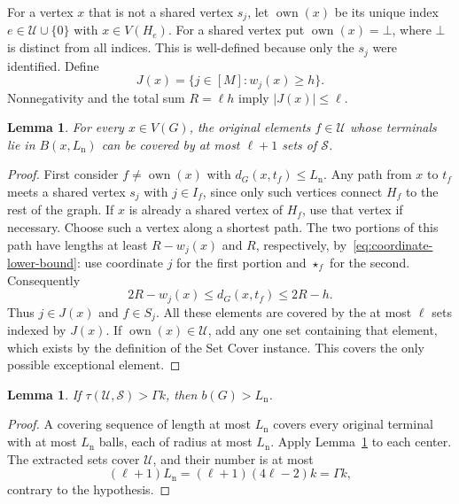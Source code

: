 \documentclass[11pt]{article}
\numberwithin{equation}{section}
\newtheorem{lemma}[theorem]{Lemma}
\theoremstyle{definition}
\begin{document}
For a vertex $x$ that is not a shared vertex $s_j$, let
$\operatorname{own}(x)$ be its unique index
$e\in\mathcal U\cup\{0\}$ with $x\in V(H_e)$. For a shared vertex put
$\operatorname{own}(x)=\bot$, where $\bot$ is distinct from all indices.
This is well-defined because only the $s_j$ were identified.
Define
\begin{equation}\label{eq:heavy-coordinates}
 J(x)=\{j\in[M]:w_j(x)\ge h\}.
\end{equation}
Nonnegativity and the total sum $R=\ell h$ imply $|J(x)|\le\ell$.

\begin{lemma}\label{lem:ball-extraction}
For every $x\in V(G)$, the original elements $f\in\mathcal U$ whose
terminals lie in $B(x,L_{\mathrm n})$ can be covered by at most
$\ell+1$ sets of $\mathcal S$.
\end{lemma}
\begin{proof}
First consider $f\ne\operatorname{own}(x)$ with
$d_G(x,t_f)\le L_{\mathrm n}$. Any path from $x$ to $t_f$ meets a
shared vertex $s_j$ with $j\in I_f$, since only such vertices connect
$H_f$ to the rest of the graph. If $x$ is already a shared vertex of
$H_f$, use that vertex if necessary. Choose such a vertex along a
shortest path. The two portions of this path have lengths at least
$R-w_j(x)$ and $R$, respectively, by~\eqref{eq:coordinate-lower-bound}:
use coordinate $j$ for the first portion and $\star_f$ for the second.
Consequently
\[
 2R-w_j(x)\le d_G(x,t_f)\le 2R-h.
\]
Thus $j\in J(x)$ and $f\in S_j$.
All these elements are covered by the at most $\ell$ sets indexed by
$J(x)$. If $\operatorname{own}(x)\in\mathcal U$, add any one set
containing that element, which exists by the definition of the Set
Cover instance. This covers the only possible exceptional element.
\end{proof}

\begin{lemma}\label{lem:hardness-soundness}
If $\tau(\mathcal U,\mathcal S)>\Gamma k$, then
$b(G)>L_{\mathrm n}$.
\end{lemma}
\begin{proof}
A covering sequence of length at most $L_{\mathrm n}$ covers every
original terminal with at most $L_{\mathrm n}$ balls, each of radius
at most $L_{\mathrm n}$. Apply Lemma~\ref{lem:ball-extraction} to each
center. The extracted sets cover $\mathcal U$, and their number is at
most
\[
 (\ell+1)L_{\mathrm n}
 =(\ell+1)(4\ell-2)k=\Gamma k,
\]
contrary to the hypothesis.
\end{proof}
\end{document}
